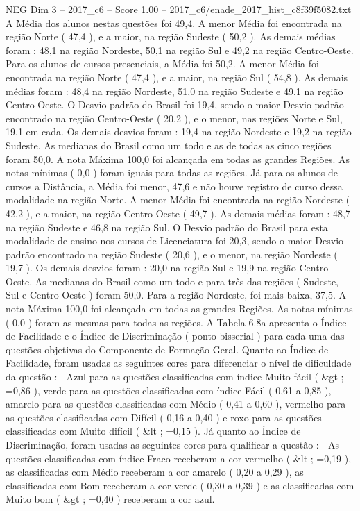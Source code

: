 \begin{textsample}{NEG Dim 3 – 2017\_c6 – Score 1.00 – 2017\_c6/enade\_2017\_hist\_c8f39f5082.txt}
A Média dos alunos nestas questões foi 49,4.
A menor Média foi encontrada na região Norte ( 47,4 ), e a maior, na região Sudeste ( 50,2 ).
As demais médias foram : 48,1 na região Nordeste, 50,1 na região Sul e 49,2 na região Centro-Oeste.
Para os alunos de cursos presenciais, a Média foi 50,2.
A menor Média foi encontrada na região Norte ( 47,4 ), e a maior, na região Sul ( 54,8 ).
As demais médias foram : 48,4 na região Nordeste, 51,0 na região Sudeste e 49,1 na região Centro-Oeste.
O Desvio padrão do Brasil foi 19,4, sendo o maior Desvio padrão encontrado na região Centro-Oeste ( 20,2 ), e o menor, nas regiões Norte e Sul, 19,1 em cada.
Os demais desvios foram : 19,4 na região Nordeste e 19,2 na região Sudeste.
As medianas do Brasil como um todo e as de todas as cinco regiões foram 50,0.
A nota Máxima 100,0 foi alcançada em todas as grandes Regiões.
As notas mínimas ( 0,0 ) foram iguais para todas as regiões.
Já para os alunos de cursos a Distância, a Média foi menor, 47,6 e não houve registro de curso dessa modalidade na região Norte.
A menor Média foi encontrada na região Nordeste ( 42,2 ), e a maior, na região Centro-Oeste ( 49,7 ).
As demais médias foram : 48,7 na região Sudeste e 46,8 na região Sul.
O Desvio padrão do Brasil para esta modalidade de ensino nos cursos de Licenciatura foi 20,3, sendo o maior Desvio padrão encontrado na região Sudeste ( 20,6 ), e o menor, na região Nordeste ( 19,7 ).
Os demais desvios foram : 20,0 na região Sul e 19,9 na região Centro-Oeste.
As medianas do Brasil como um todo e para três das regiões ( Sudeste, Sul e Centro-Oeste ) foram 50,0.
Para a região Nordeste, foi mais baixa, 37,5.
A nota Máxima 100,0 foi alcançada em todas as grandes Regiões.
As notas mínimas ( 0,0 ) foram as mesmas para todas as regiões.
A Tabela 6.8a apresenta o Índice de Facilidade e o Índice de Discriminação ( ponto-bisserial ) para cada uma das questões objetivas do Componente de Formação Geral.
Quanto ao Índice de Facilidade, foram usadas as seguintes cores para diferenciar o nível de dificuldade da questão :  Azul para as questões classificadas com índice Muito fácil ( \&gt ; =0,86 ), verde para as questões classificadas com índice Fácil ( 0,61 a 0,85 ), amarelo para as questões classificadas com Médio ( 0,41 a 0,60 ), vermelho para as questões classificadas com Difícil ( 0,16 a 0,40 ) e roxo para as questões classificadas com Muito difícil ( \&lt ; =0,15 ).
Já quanto ao Índice de Discriminação, foram usadas as seguintes cores para qualificar a questão :  As questões classificadas com índice Fraco receberam a cor vermelho ( \&lt ; =0,19 ), as classificadas com Médio receberam a cor amarelo ( 0,20 a 0,29 ), as classificadas com Bom receberam a cor verde ( 0,30 a 0,39 ) e as classificadas com Muito bom ( \&gt ; =0,40 ) receberam a cor azul.

\end{textsample}
